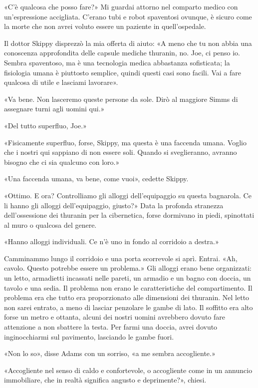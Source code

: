 «C'è qualcosa che posso fare?» Mi guardai attorno nel comparto medico
con un'espressione accigliata. C'erano tubi e robot spaventosi ovunque,
è sicuro come la morte che non avrei voluto essere un paziente in
quell'ospedale.

Il dottor Skippy disprezzò la mia offerta di aiuto: «A meno che tu non
abbia una conoscenza approfondita delle capsule mediche thuranin, no.
Joe, ci penso io. Sembra spaventoso, ma è una tecnologia medica
abbastanza sofisticata; la fisiologia umana è piuttosto semplice, quindi
questi casi sono facili. Vai a fare qualcosa di utile e lasciami
lavorare».

«Va bene. Non lasceremo queste persone da sole. Dirò al maggiore Simms
di assegnare turni agli uomini qui.»

«Del tutto superfluo, Joe.»

«Fisicamente superfluo, forse, Skippy, ma questa è una faccenda umana.
Voglio che i nostri qui sappiano di non essere soli. Quando si
sveglieranno, avranno bisogno che ci sia qualcuno con loro.»

«Una faccenda umana, va bene, come vuoi», cedette Skippy.

«Ottimo. E ora? Controlliamo gli alloggi dell'equipaggio su questa
bagnarola. Ce li hanno gli alloggi dell'equipaggio, giusto?» Data la
profonda stranezza dell'ossessione dei thuranin per la cibernetica,
forse dormivano in piedi, spinottati al muro o qualcosa del genere.

«Hanno alloggi individuali. Ce n'è uno in fondo al corridoio a destra.»

Camminammo lungo il corridoio e una porta scorrevole si aprì. Entrai.
«Ah, cavolo. Questo potrebbe essere un problema.» Gli alloggi erano bene
organizzati: un letto, armadietti incassati nelle pareti, un armadio e
un bagno con doccia, un tavolo e una sedia. Il problema non erano le
caratteristiche del compartimento. Il problema era che tutto era
proporzionato alle dimensioni dei thuranin. Nel letto non sarei entrato,
a meno di lasciar penzolare le gambe di lato. Il soffitto era alto forse
un metro e ottanta, alcuni dei nostri uomini avrebbero dovuto fare
attenzione a non sbattere la testa. Per farmi una doccia, avrei dovuto
inginocchiarmi sul pavimento, lasciando le gambe fuori.

«Non lo so», disse Adams con un sorriso, «a me sembra accogliente.»

«Accogliente nel senso di caldo e confortevole, o accogliente come in un
annuncio immobiliare, che in realtà significa angusto e deprimente?»,
chiesi.

